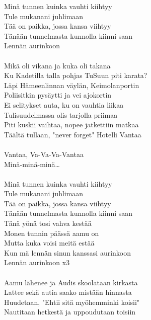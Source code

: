 
Minä tunnen kuinka vauhti kiihtyy \\
Tule mukanani juhlimaan \\
Tää on paikka, jossa kansa viihtyy \\
Tänään tunnelmasta kunnolla kiinni saan \\
Lennän aurinkoon \\
\hspace{10mm} \\
Mikä oli vikana ja kuka oli takana \\
Ku Kadetilla talla pohjas TuSuun piti karata? \\
Läpi Hämeenlinnan väylän, Keimolanportin \\
Poliisitkin pysäytti ja vei ajokortin \\
Ei selitykset auta, ku on vauhtia liikaa \\
Tulisuudelmassa olis tarjolla priimaa \\
Piti kuskii vaihtaa, nopee jatkettiin matkaa \\
Täältä tullaan, "never forget" Hotelli Vantaa \\
\hspace{10mm} \\
Vantaa, Va-Va-Va-Vantaa \\
Minä-minä-minä… \\
\hspace{10mm} \\
Minä tunnen kuinka vauhti kiihtyy \\
Tule mukanani juhlimaan \\
Tää on paikka, jossa kansa viihtyy \\
Tänään tunnelmasta kunnolla kiinni saan \\
Tänä yönä tosi vahva kestää \\
Monen tunnin päässä aamu on \\
Mutta kuka voisi meitä estää \\
Kun mä lennän sinun kanssasi aurinkoon \\
Lennän aurinkoon x3 \\
\hspace{10mm} \\
Aamu lähenee ja Audis skoolataan kirkasta \\
Lattee sekä autia saako mistään hinnasta \\
Huudetaan, "Ehtii sitä myöhemminki koisii" \\
Nautitaan hetkestä ja uppoudutaan toisiin \\
